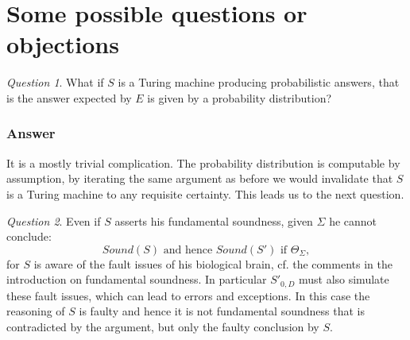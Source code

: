 \documentclass[9pt,twocolumn,twoside,lineno]{pnas-new}
\numberwithin{equation}{section}
\theoremstyle{definition}
\theoremstyle{remark}
\newtheorem{question}{Question}
\begin{document}
\section{Some possible questions or objections}
\begin{question} \label{quest:probabilistic}  What if $S$ is a Turing machine producing probabilistic answers, that is the answer  expected by $E$ is given by a probability distribution? 
\end{question}
\subsubsection* {Answer} It is a mostly trivial complication. The probability distribution is computable by assumption, by iterating the same argument as before we would invalidate that $S$ is a Turing machine to any requisite certainty. This leads us to the next question.
\begin{question} \label{question:2}  Even if $S$ asserts his fundamental soundness, given $\Sigma$ he cannot  conclude: 
  \begin{equation*}
     Sound (S) \text{ and hence } Sound (S') \text{ if } \Theta _{\Sigma},
  \end{equation*} 
    for $S$ is aware of the fault issues of his biological brain, cf. the comments in the introduction on fundamental soundness.
In particular  $S' _{0,D} $ must also simulate these fault issues,  which can lead to errors and exceptions.  In this case the reasoning of $S$ is faulty and hence it is not fundamental soundness that is contradicted by the argument, but only the faulty conclusion by $S$.
\end{question}
\end{document}
